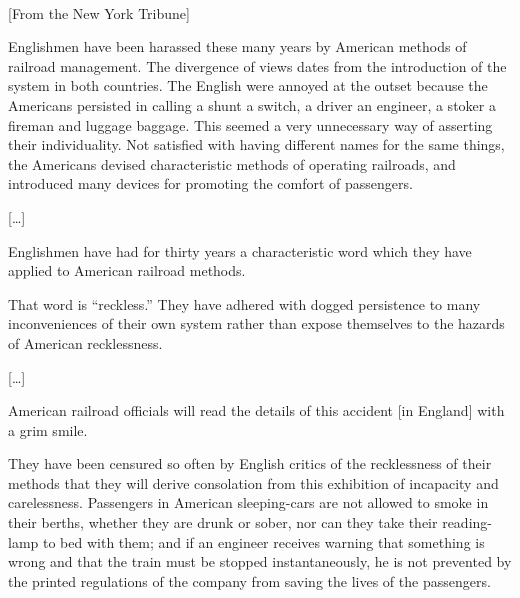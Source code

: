 \begin{ipquote}
\begin{center}
\\
{[From the New York Tribune]}
\end{center}
{Englishmen have been harassed these many years by American methods of railroad management. The divergence of views dates from the introduction of the system in both countries. The English were annoyed at the outset because the Americans persisted in calling a shunt a switch, a driver an engineer, a stoker a fireman and luggage baggage. This seemed a very unnecessary way of asserting their individuality. Not satisfied with having different names for the same things, the Americans devised characteristic methods of operating railroads, and introduced many devices for promoting the comfort of passengers.

\centering
{[…]}

Englishmen have had for thirty years a characteristic word which they have applied to American railroad methods.} {That word is “reckless.” They have adhered with dogged persistence to many inconveniences of their own system rather than expose themselves to the hazards of American recklessness.

\centering
{[…]}

American railroad officials will read the details of this accident [in England] with a grim smile.} They have been censured so often by English critics of the recklessness of their methods that they will derive consolation from this exhibition of incapacity and carelessness. Passengers in American sleeping-cars are not allowed to smoke in their berths, whether they are drunk or sober, nor can they take their reading-lamp to bed with them; and if an engineer receives warning that something is wrong and that the train must be stopped instantaneously, he is not prevented by the printed regulations of the company from saving the lives of the passengers.
\end{ipquote}

